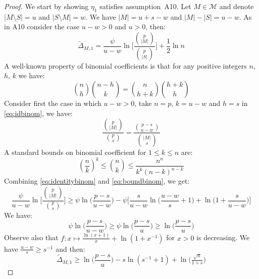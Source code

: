 \documentclass[aos]{imsart}
\theoremstyle{plain}
\begin{document}
\begin{supplement}
\begin{proof}
    We start by showing $\eta_1$ satisfies assumption~A10. Let $M\in\mathcal{M}$ and denote $|M\setminus S|=u$ and $|S\setminus M|=w$. We have $|M|=u+s-w$ and $|M|-|S|=u-w$. As in A10 consider the case $u-w>0$ and $u>0$, then:
    \begin{equation*}
        \tilde{\Delta}_{M,1}=\frac{\psi}{u-w}\ln\bigg[\frac{{p \choose |M|}}{{p \choose |S|}}\bigg]+ \frac{1}{2}\ln n
    \end{equation*}
    A well-known property of binomial coefficients is that for any positive integers $n$, $h$, $k$ we have:
    \begin{equation}\label{eq:idbinom}
        \binom{n}{h}\binom{n-h}{k}=\binom{n}{h+k}\binom{h+k}{h}
    \end{equation}
    Consider first the case in which $u-w>0$, take $n=p$, $k=u-w$ and $h=s$ in \eqref{eq:idbinom}, we have:
    \begin{equation}\label{eq:identitybinom}
        \frac{{p \choose |M|}}{{p \choose s}}=
        \frac{{p -s \choose u-w}}{{|M| \choose s}}
    \end{equation}
A standard bounds on binomial coefficient for $1\leq k\leq n$ are:
\begin{equation}\label{eq:boundbinom}
  \left(\frac{n}{k}\right)^k \leq  {n \choose k} \leq \frac{n^n}{k^k(n-k)^{n-k}}
\end{equation}
Combining \eqref{eq:identitybinom} and \eqref{eq:boundbinom}, we get:
$$ \frac{\psi}{u-w}\ln\bigg[\frac{{p \choose |M|}}{{p \choose s}}\bigg] \geq \psi\ln\bigg(\frac{p-s}{u-w}\bigg)-\psi\bigg[\frac{s}{u-w}\ln\bigg(\frac{u-w}{s}+1\bigg) +\ln\bigg(1+\frac{s}{u-w}\bigg) \bigg]$$
We have:
$$\psi\ln\bigg(\frac{p-s}{u-w}\bigg) \geq \psi\ln\bigg(\frac{p-s}{u}\bigg) \geq \ln\bigg(\frac{p-s}{u}\bigg)$$
Observe also that $f:x \mapsto \frac{\ln(x+1)}{x}+\ln(1+{x}^{-1})$ for $x>0$ is decreasing. We have $\frac{u-w}{s} \geq s^{-1}$ and then: 
\begin{equation}\label{eq:lowerboundb1ebic2}
        \tilde{\Delta}_{M,1} \geq \ln\big(\frac{p-s}{u}\big)-s\ln(s^{-1}+1)+ \ln \big(\tfrac{\sqrt{n}}{1+s}\big)

\end{equation}
\end{proof}
\end{supplement}
\end{document}
